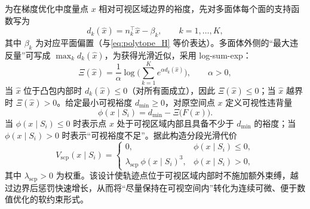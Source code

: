 为在梯度优化中度量点 \(x\) 相对可视区域边界的裕度，先对多面体每个面的支持函数写为
\begin{equation}
d_k(\hat{x})=n_k^\top\hat{x}-\beta_k,\qquad k=1,\dots,K,
\label{eq:face_support}
\end{equation}
其中 \(\beta_k\) 为对应平面偏置（与\autoref{eq:polytope_H} 等价表达）。多面体外侧的“最大违反量”可写成 \(\max_k d_k(\hat{x})\)，为获得光滑近似，采用 log-sum-exp：
\begin{equation}
\Xi(\hat{x})
=\frac{1}{\alpha}\log\!\Big(\sum_{k=1}^{K}e^{\alpha d_k(\hat{x})}\Big),
\qquad \alpha>0,
\label{eq:lse_def}
\end{equation}
当 \(\hat{x}\) 位于凸包内部时 \(d_k(\hat{x})\le 0\)（对所有面成立），因此 \(\Xi(\hat{x})\le 0\)；当 \(\hat{x}\) 越界时 \(\Xi(\hat{x})>0\)。给定最小可视裕度 \(d_{\min}\ge 0\)，对原空间点 \(x\) 定义可视性违背量
\begin{equation}
\phi(x\mid S_i)=d_{\min}-\Xi\big(F(x)\big).
\label{eq:violation}
\end{equation}
当 \(\phi(x\mid S_i)\le 0\) 时表示点 \(x\) 处于可视区域内部且具备不少于 \(d_{\min}\) 的裕度；当 \(\phi(x\mid S_i)>0\) 时表示“可视裕度不足”。据此构造分段光滑代价
\begin{equation}
V_{\mathrm{scp}}(x\mid S_i)=
\begin{cases}
0,& \phi(x\mid S_i)\le 0,\\[3pt]
\lambda_{\mathrm{scp}}\ \phi(x\mid S_i)^{3},& \phi(x\mid S_i)>0,
\end{cases}
\label{eq:scp_penalty}
\end{equation}
其中 \(\lambda_{\mathrm{scp}}>0\) 为权重。该设计使轨迹点位于可视区域内部时不施加额外束缚，越过边界后惩罚快速增长，从而将“尽量保持在可视空间内”转化为连续可微、便于数值优化的软约束形式。

